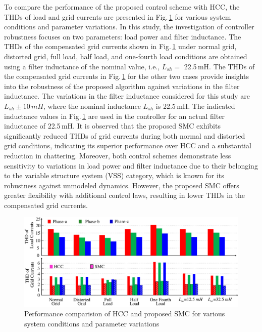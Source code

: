 To compare the performance of the proposed control scheme with HCC, the THDs of load and grid currents are presented in Fig.\,\ref{4.fig} for various system conditions and parameter variations. In this study, the investigation of controller robustness focuses on two parameters: load power and filter inductance. The THDs of the compensated grid currents shown in Fig.\,\ref{4.fig} under normal grid, distorted grid, full load, half load, and one-fourth load conditions are obtained using a filter inductance of the nominal value, i.e., $L_{sh} =$ 22.5\,mH. The THDs of the compensated grid currents in Fig.\,\ref{4.fig} for the other two cases provide insights into the robustness of the proposed algorithm against variations in the filter inductance. The variations in the filter inductance considered for this study are $L_{sh}\pm 10\,\si{mH}$, where the nominal inductance $L_{sh}$ is 22.5\,mH. The indicated inductance values in Fig.\,\ref{4.fig} are used in the controller for an actual filter inductance of 22.5\,mH. It is observed that the proposed SMC exhibits significantly reduced THDs of grid currents during both normal and distorted grid conditions, indicating its superior performance over HCC and a substantial reduction in chattering. Moreover, both control schemes demonstrate less sensitivity to variations in load power and filter inductance due to their belonging to the variable structure system (VSS) category, which is known for its robustness against unmodeled dynamics. However, the proposed SMC offers greater flexibility with additional control laws, resulting in lower THDs in the compensated grid currents.
\begin{figure}[t]\centering
	\includegraphics[scale=0.5]{figures/Chapter_4/Mine/Bar_Plot.pdf}
	\caption{Performance comparision of HCC and proposed SMC for various system conditions and parameter variations} 
	\label{4.fig}
\end{figure}  

